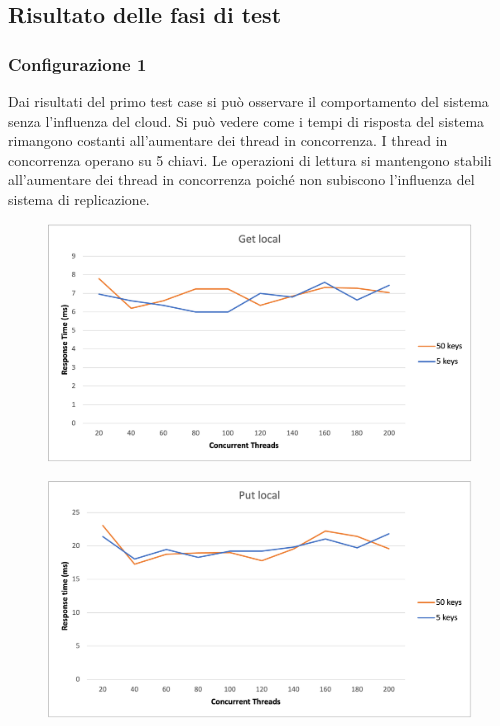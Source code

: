 \documentclass[conference]{IEEEtran}
\begin{document}
\subsection{Risultato delle fasi di test}
\subsubsection{Configurazione 1}
Dai risultati del primo test case si può osservare il comportamento del sistema senza l'influenza del cloud.
Si può vedere come i tempi di risposta del sistema rimangono costanti all'aumentare dei thread in concorrenza.
I thread in concorrenza operano su 5 chiavi. Le operazioni di lettura si mantengono stabili all'aumentare dei thread in concorrenza
poiché non subiscono l'influenza del sistema di replicazione.
\begin{figure}[H]
  \includegraphics[scale=0.5]{images/getlocal.png}
\end{figure}
\begin{figure}[H]
  \includegraphics[scale=0.5]{images/putlocal.png}
\end{figure}
\end{document}
